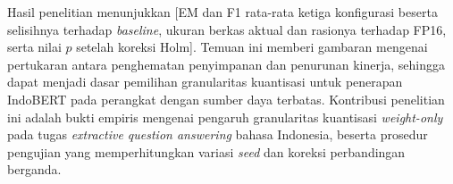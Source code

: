 \begin{singlespace}
Hasil penelitian menunjukkan [EM dan F1 rata-rata ketiga konfigurasi beserta selisihnya terhadap \textit{baseline}, ukuran berkas aktual dan rasionya terhadap FP16, serta nilai $p$ setelah koreksi Holm]. Temuan ini memberi gambaran mengenai pertukaran antara penghematan penyimpanan dan penurunan kinerja, sehingga dapat menjadi dasar pemilihan granularitas kuantisasi untuk penerapan IndoBERT pada perangkat dengan sumber daya terbatas. Kontribusi penelitian ini adalah bukti empiris mengenai pengaruh granularitas kuantisasi \textit{weight-only} pada tugas \textit{extractive question answering} bahasa Indonesia, beserta prosedur pengujian yang memperhitungkan variasi \textit{seed} dan koreksi perbandingan berganda.

\end{singlespace}
\clearpage
